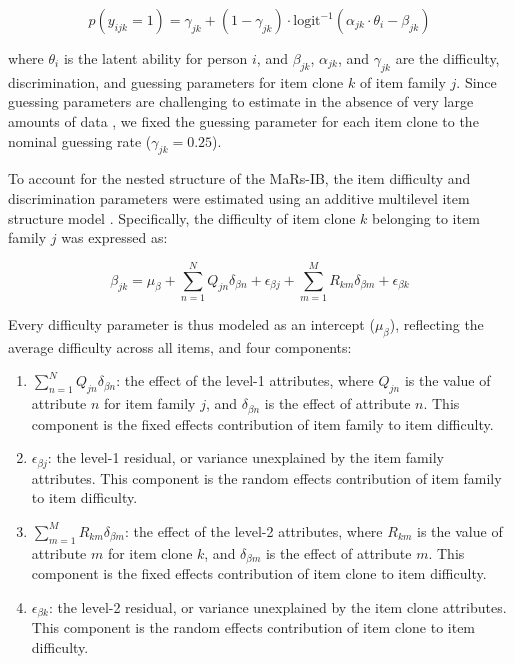 \documentclass[a4paper,man,natbib]{apa6}
\begin{document}
\begin{equation}
p(y_{ijk} = 1) = \gamma_{jk} + (1-\gamma_{jk}) \cdot \text{logit}^{-1} \left( \alpha_{jk} \cdot \theta_i - \beta_{jk} \right)
\end{equation}

\noindent where $\theta_i$ is the latent ability for person $i$, and $\beta_{jk}$, $\alpha_{jk}$, and $\gamma_{jk}$ are the difficulty, discrimination, and guessing parameters for item clone $k$ of item family $j$. Since guessing parameters are challenging to estimate in the absence of very large amounts of data \citep{han2012fixing}, we fixed the guessing parameter for each item clone to the nominal guessing rate ($\gamma_{jk} = 0.25$).

To account for the nested structure of the MaRs-IB, the item difficulty and discrimination parameters were estimated using an additive multilevel item structure model \citep{cho2014additive}. Specifically, the difficulty of item clone $k$ belonging to item family $j$ was expressed as:  

\begin{equation}
\beta_{jk} = \mu_\beta + \sum_{n=1}^N Q_{jn} \delta_{\beta n} + \epsilon_{\beta j} + \sum_{m=1}^M R_{km} \delta_{\beta m} + \epsilon_{\beta k}
\end{equation}

\noindent Every difficulty parameter is thus modeled as an intercept ($\mu_\beta$), reflecting the average difficulty across all items, and four components:

\begin{enumerate}

\item $\sum_{n=1}^N Q_{jn} \delta_{\beta n}$: the effect of the level-1 attributes, where $Q_{jn}$ is the value of attribute $n$ for item family $j$, and $\delta_{\beta n}$ is the effect of attribute $n$. This component is the fixed effects contribution of item family to item difficulty.

\item $\epsilon_{\beta j}$: the level-1 residual, or variance unexplained by the item family attributes. This component is the random effects contribution of item family to item difficulty.

\item $\sum_{m=1}^M R_{km} \delta_{\beta m}$: the effect of the level-2 attributes, where $R_{km}$ is the value of attribute $m$ for item clone $k$, and $\delta_{\beta m}$ is the effect of attribute $m$. This component is the fixed effects contribution of item clone to item difficulty.

\item $\epsilon_{\beta k}$: the level-2 residual, or variance unexplained by the item clone attributes. This component is the random effects contribution of item clone to item difficulty.

\end{enumerate}
\end{document}
